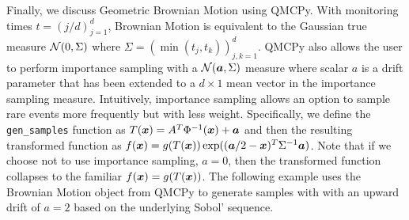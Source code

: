 \documentclass[graybox,footinfo]{svmult}
\begin{document}
Finally, we discuss Geometric Brownian Motion using QMCPy. With monitoring times $t = (j/d)_{j=1}^d$, Brownian Motion is equivalent to the Gaussian true measure ${\mathcal{N}}(0,\Sigma)$ where $\Sigma = (\min(t_j,t_k))_{j,k=1}^d$. QMCPy also allows the user to perform importance sampling with a ${\mathcal{N}}({\boldsymbol{a}},\Sigma)$ measure where scalar $a$ is a drift parameter that has been extended to a $d \times 1$ mean vector in the importance sampling measure. Intuitively, importance sampling allows an option to sample rare events more frequently but with less weight. Specifically, we define the \texttt{gen\_samples} function as $T({\boldsymbol{x}}) = A^T\Phi^{-1}({\boldsymbol{x}}) + {\boldsymbol{a}}$ and then the resulting transformed function as $f({\boldsymbol{x}}) = g(T({\boldsymbol{x}}))\exp(({\boldsymbol{a}}/2-{\boldsymbol{x}})^T\Sigma^{-1}{\boldsymbol{a}})$. Note that if we choose not to use importance sampling, $a=0$, then the transformed function collapses to the familiar $f({\boldsymbol{x}}) = g(T({\boldsymbol{x}}))$. The following example uses the Brownian Motion object from QMCPy to generate samples with with an upward drift of $a=2$ based on the underlying Sobol' sequence. 


\end{document}
